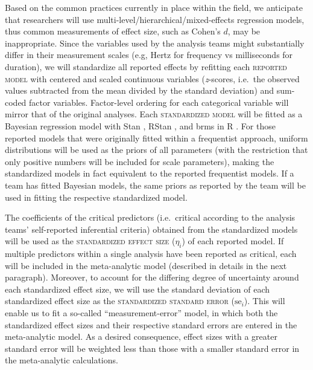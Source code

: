 \documentclass[Review,times,sageh]{sagej}
\begin{document}
Based on the common practices currently in place within the field, we anticipate that researchers will use multi-level/hierarchical/mixed-effects regression models, thus common measurements of effect size, such as Cohen's \(d\), may be inappropriate.
Since the variables used by the analysis teams might substantially differ in their measurement scales (e.g, Hertz for frequency vs milliseconds for duration), we will standardize all reported effects by refitting each \textsc{reported model} with centered and scaled continuous variables (\emph{z}-scores, i.e.~the observed values subtracted from the mean divided by the standard deviation) and sum-coded factor variables.
Factor-level ordering for each categorical variable will mirror that of the original analyses.
Each \textsc{standardized model} will be fitted as a Bayesian regression model with Stan \citep{stan2021}, RStan \citep{stan2020a}, and brms \citep{burkner2017} in R \citep{R-base}.
For those reported models that were originally fitted within a frequentist approach, uniform distributions will be used as the priors of all parameters (with the restriction that only positive numbers will be included for scale parameters), making the standardized models in fact equivalent to the reported frequentist models.
If a team has fitted Bayesian models, the same priors as reported by the team will be used in fitting the respective standardized model.

The coefficients of the critical predictors (i.e.~critical according to the analysis teams' self-reported inferential criteria) obtained from the standardized models will be used as the \textsc{standardized effect size} (\(\eta_i\)) of each reported model.
If multiple predictors within a single analysis have been reported as critical, each will be included in the meta-analytic model (described in details in the next paragraph).
Moreover, to account for the differing degree of uncertainty around each standardized effect size, we will use the standard deviation of each standardized effect size as the \textsc{standardized standard error} (\(\text{se}_i\)).
This will enable us to fit a so-called ``measurement-error'' model, in which both the standardized effect sizes and their respective standard errors are entered in the meta-analytic model.
As a desired consequence, effect sizes with a greater standard error will be weighted less than those with a smaller standard error in the meta-analytic calculations.
\end{document}
